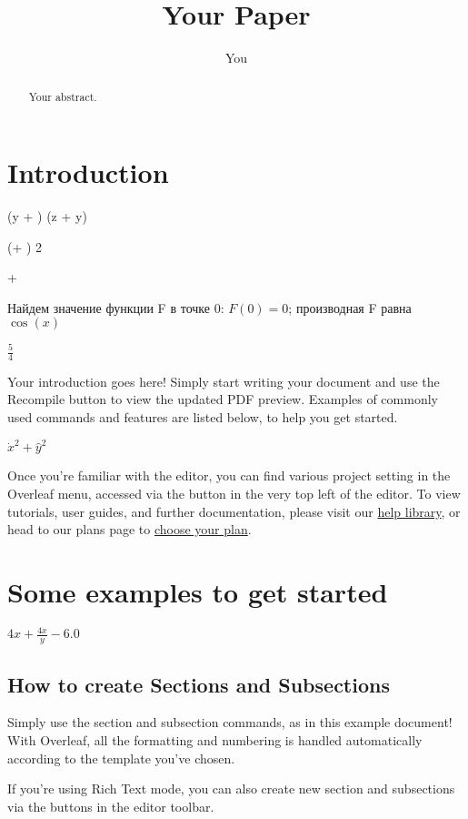\documentclass{article}
\title{Your Paper}
\author{You}
\begin{document}
\maketitle

\begin{abstract}
Your abstract.
\end{abstract}





\section{Introduction}

\left(y + \right)  \left(z + y\right)

\left(\left[\begin{matrix}1 & 0\\0 & 0\end{matrix}\right] + \left[\begin{matrix}1 & -1\\3 & 4\end{matrix}\right]\right)  2

 + 


Найдем значение функции F в точке 0: $F(0) = 0$; производная F равна $\cos{\left(x \right)}$

$\frac{5}{4}$

Your introduction goes here! Simply start writing your document and use the Recompile button to view the updated PDF preview. Examples of commonly used commands and features are listed below, to help you get started.

$\dot{x}^{2} + \hat{y}^{2}$

Once you're familiar with the editor, you can find various project setting in the Overleaf menu, accessed via the button in the very top left of the editor. To view tutorials, user guides, and further documentation, please visit our \href{https://www.overleaf.com/learn}{help library}, or head to our plans page to \href{https://www.overleaf.com/user/subscription/plans}{choose your plan}.

\section{Some examples to get started}
$4 x + \frac{4 x}{y} - 6.0$

\subsection{How to create Sections and Subsections}

Simply use the section and subsection commands, as in this example document! With Overleaf, all the formatting and numbering is handled automatically according to the template you've chosen. 


If you're using Rich Text mode, you can also create new section and subsections via the buttons in the editor toolbar.
\end{document}

